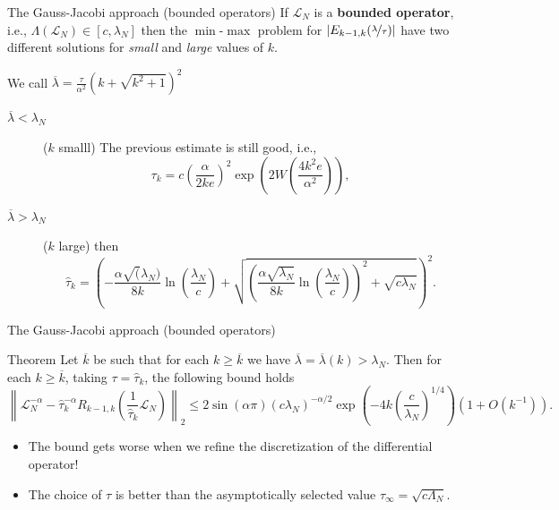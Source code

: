\documentclass[aspectratio=169,xcolor=dvipsnames]{beamer}
\begin{document}
	\begin{frame}{The Gauss-Jacobi approach (bounded operators)}
	If $\mathcal{L}_N$ is a \textbf{bounded operator}, i.e., $\Lambda(\mathcal{L}_N) \in [c,\lambda_N]$ then the $\min$-$\max$ problem for $|E_{k-1,k}(\nicefrac{\lambda}{\tau})|$ have two different solutions for \emph{small} and \emph{large} values of $k$.
	
	We call $\overline{\lambda} = \frac{\tau}{\alpha^2} (k + \sqrt{k^2+1})^2$
	
	\begin{description}
		\item[$\overline{\lambda} < \lambda_N$] ($k$ smalll) The previous estimate is still good, i.e.,
		\[
		\tau_k = c \left( \frac{\alpha}{2k e} \right)^2 \exp\left(2 W\left( \frac{4k^2 e}{\alpha^2}\right)  \right),
		\]
		\item[$\overline{\lambda} > \lambda_N$]  ($k$ large) then
		\[
		\hat{\tau}_k = \left( - \frac{\alpha \sqrt(\lambda_N)}{8k} \ln\left(\frac{\lambda_N}{c}\right) + \sqrt{\left( \frac{\alpha \sqrt{\lambda_N}}{8k}\ln\left(\frac{\lambda_N}{c}\right) \right)^2 + \sqrt{c \lambda_N}} \right)^2.
		\]
	\end{description}
	
	\end{frame}

	\begin{frame}{The Gauss-Jacobi approach (bounded operators)}
	\begin{alertblock}{Theorem \parencite[Theorem~3]{MR3987166}}
	Let $\overline{k}$ be such that for each $k \geq \overline{k}$ we have $\overline{\lambda} = \overline{\lambda}(k) > \lambda_N$. Then for each $k \geq \overline{k}$, taking $\tau = \hat{\tau}_k$, the following bound holds
	\[
	\left\| \mathcal{L}_N^{-\alpha} - \hat{\tau}_k^{-\alpha} R_{k-1,k}\left(\frac{1}{\hat{\tau}_k} \mathcal{L}_N\right) \right\|_2 \leq 2 \sin(\alpha\pi) (c\lambda_N)^{-\alpha/2} \exp\left( -4k \left(\frac{c}{\lambda_N}\right)^{1/4} \right)(1 + O(k^{-1})).
	\]
	\end{alertblock}

	\begin{itemize}
		\item[\faEye] The bound gets worse when we refine the discretization of the differential operator!
		\item[\faHammer] The choice of $\tau$ is better than the asymptotically selected value $\tau_{\infty} = \sqrt{c \Lambda_N}$.
	\end{itemize}

	\end{frame}
\end{document}
